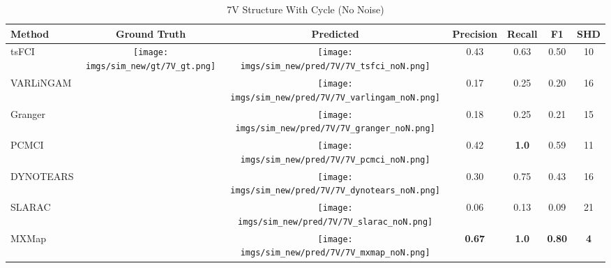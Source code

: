 \begin{table}[htb]
\begin{tabular}{l|c|c|c|c|c|c}
Method    & Ground Truth      & Predicted & Precision     & Recall       & F1            & SHD        \\ \hline
tsFCI     & \multirow{7}{*}[-9em]{\begin{minipage}{.17\linewidth} \centering \texttt{[image: imgs/sim\_new/gt/7V\_gt.png]} \end{minipage}} & \begin{minipage}{.17\linewidth} \centering \texttt{[image: imgs/sim\_new/pred/7V/7V\_tsfci\_noN.png]} \end{minipage}   & 0.43          & 0.63         & 0.50          & 10         \\
VARLiNGAM &                   &  \begin{minipage}{.17\linewidth} \centering \texttt{[image: imgs/sim\_new/pred/7V/7V\_varlingam\_noN.png]} \end{minipage}   & 0.17          & 0.25         & 0.20          & 16         \\
Granger   &                   &  \begin{minipage}{.17\linewidth} \centering \texttt{[image: imgs/sim\_new/pred/7V/7V\_granger\_noN.png]} \end{minipage}   & 0.18          & 0.25         & 0.21          & 15         \\
PCMCI     &                   &  \begin{minipage}{.17\linewidth} \centering \texttt{[image: imgs/sim\_new/pred/7V/7V\_pcmci\_noN.png]} \end{minipage}   & 0.42          & \textbf{1.0} & 0.59          & 11         \\
DYNOTEARS &                   & \begin{minipage}{.17\linewidth} \centering \texttt{[image: imgs/sim\_new/pred/7V/7V\_dynotears\_noN.png]} \end{minipage}   & 0.30          & 0.75         & 0.43          & 16         \\
SLARAC    &                   &  \begin{minipage}{.17\linewidth} \centering \texttt{[image: imgs/sim\_new/pred/7V/7V\_slarac\_noN.png]} \end{minipage}   & 0.06          & 0.13         & 0.09          & 21         \\ \cline{1-1} \cline{3-7} 
MXMap     &                   &  \begin{minipage}{.17\linewidth} \centering \texttt{[image: imgs/sim\_new/pred/7V/7V\_mxmap\_noN.png]} \end{minipage}   & \textbf{0.67} & \textbf{1.0} & \textbf{0.80} & \textbf{4}
\end{tabular}
\caption{7V Structure With Cycle (No Noise)}
\label{tab:7V_noN}
\end{table}

